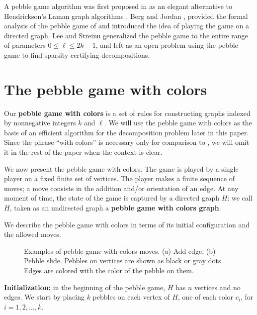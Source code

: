 \documentclass[11pt]{article}
\begin{document}
A pebble game algorithm was first proposed in \cite{JaHe97} as an elegant 
alternative to Hendrickson's Laman graph  algorithms
\cite{hendrickson-thesis,hendrickson:uniqueRealizability:1992}. Berg and Jordan  
\cite{Be03}, provided the formal analysis of the pebble game of \cite{JaHe97} and introduced 
the idea of playing the game on a directed graph. Lee and Streinu \cite{LeSt05} 
generalized the pebble game to the entire range of parameters $0\le \ell\le 2k-1$, 
and left as an open problem using the pebble game to find 
sparsity certifying decompositions.  

\section{The pebble game with colors}
Our {\bf pebble game with colors} is a set of rules for 
constructing graphs indexed by nonnegative integers $k$ and $\ell$.    
We will use the pebble game with colors as the basis of an efficient 
algorithm for the decomposition problem later in this paper.
Since the 
phrase ``with colors'' is necessary only for comparison to \cite{LeSt05},
we will omit it in the rest of the paper when the context is clear.

We now present the pebble game with colors.
The game is played by a single player on a fixed finite set of
vertices. The player makes a finite sequence of moves;  a move
consists in the addition and/or orientation of an edge. At any
moment of time, the state of the game is captured by a directed 
graph $H$: we call $H$, taken as an undirected 
graph a {\bf pebble game with colors graph}.

We describe the pebble game with colors in terms of its initial configuration
and the allowed moves.

\begin{figure}[htbp]
	\centering
	\hspace{.3in}
	\caption{Examples of pebble game with colors moves. (a) Add edge. (b) Pebble slide.
	Pebbles on vertices are shown as black or gray dots.  Edges are colored with the color
	of the pebble on them.}
\end{figure}

	{\bf Initialization:} in the beginning of the pebble game, $H$ has
	$n$ vertices and no edges.  We start by placing $k$ pebbles on each
	vertex of $H$, one of each color $c_i$, for $i=1,2,\ldots,k$.
\end{document}
